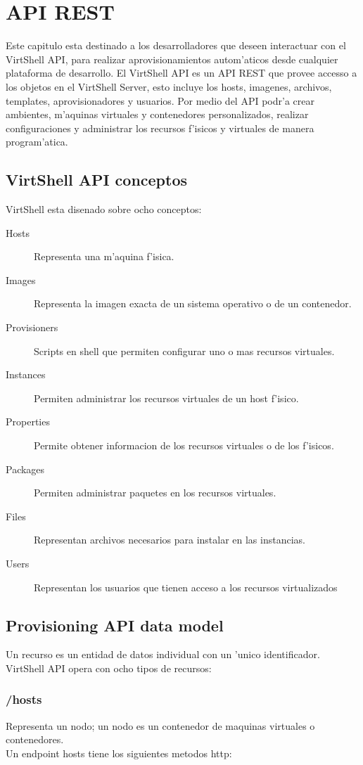 \chapter{API REST}
\label{capapi}

Este capitulo esta destinado a los desarrolladores que deseen interactuar con el VirtShell API, para realizar aprovisionamientos autom'aticos desde cualquier plataforma de desarrollo. El VirtShell API es un API REST que provee accesso a los objetos en el VirtShell Server, esto incluye los hosts, imagenes, archivos, templates, aprovisionadores y usuarios. Por medio del API podr'a crear ambientes, m'aquinas virtuales y contenedores personalizados, realizar configuraciones y administrar los recursos f'isicos y virtuales de manera program'atica. 

\section{VirtShell API conceptos}
VirtShell esta disenado sobre ocho conceptos:

\begin{description}
\item [Hosts] Representa una m'aquina f'isica.
\item [Images] Representa la imagen exacta de un sistema operativo o de un contenedor.
\item [Provisioners] Scripts en shell que permiten configurar uno o mas recursos virtuales.
\item [Instances] Permiten administrar los recursos virtuales de un host f'isico.
\item [Properties] Permite obtener informacion de los recursos virtuales o de los f'isicos.
\item [Packages] Permiten administrar paquetes en los recursos virtuales.
\item [Files] Representan archivos necesarios para instalar en las instancias.
\item [Users] Representan los usuarios que tienen acceso a los recursos virtualizados
\end{description}

\section{Provisioning API data model}
Un recurso es un entidad de datos individual con un 'unico identificador. VirtShell API opera con ocho tipos de recursos:

\subsection{/hosts}
Representa un nodo; un nodo es un contenedor de maquinas virtuales o contenedores.
\\
Un endpoint hosts tiene los siguientes metodos http:


